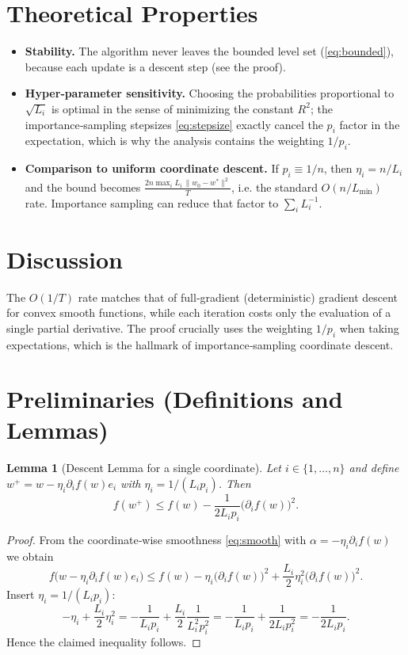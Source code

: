\documentclass{article}
\newtheorem{lemma}{Lemma}
\begin{document}
\section*{Theoretical Properties}
\begin{itemize}
\item \textbf{Stability.} The algorithm never leaves the bounded level set
(\ref{eq:bounded}), because each update is a descent step (see the proof).
\item \textbf{Hyper‑parameter sensitivity.}
Choosing the probabilities proportional to $\sqrt{L_i}$ is optimal in the
sense of minimizing the constant $R^2$; the importance‑sampling stepsizes
\eqref{eq:stepsize} exactly cancel the $p_i$ factor in the expectation, which
is why the analysis contains the weighting $1/p_i$.
\item \textbf{Comparison to uniform coordinate descent.}
If $p_i\equiv 1/n$, then $\eta_i=n/L_i$ and the bound becomes
$\frac{2n\max_i L_i\,\|w_0-w^*\|^2}{T}$, i.e. the standard $O(n/L_{\min})$ rate.
Importance sampling can reduce that factor to $\sum_i L_i^{-1}$.
\end{itemize}

\section*{Discussion}
The $O(1/T)$ rate matches that of full‑gradient (deterministic) gradient descent
for convex smooth functions, while each iteration costs only the evaluation of a
single partial derivative.  The proof crucially uses the weighting $1/p_i$
when taking expectations, which is the hallmark of importance‑sampling
coordinate descent.

\newpage
\section*{Preliminaries (Definitions and Lemmas)}
\begin{lemma}[Descent Lemma for a single coordinate]
\label{lem:descent}
Let $i\in\{1,\dots,n\}$ and define $w^{+}=w-\eta_i\partial_i f(w)e_i$ with
$\eta_i=1/(L_i p_i)$.  Then
\[
f(w^{+})\le f(w)-\frac{1}{2L_i p_i}\bigl(\partial_i f(w)\bigr)^{2}.
\]
\end{lemma}
\begin{proof}
From the coordinate‑wise smoothness \eqref{eq:smooth} with
$\alpha=-\eta_i\partial_i f(w)$ we obtain
\[
f\!\bigl(w-\eta_i\partial_i f(w)e_i\bigr)
\le f(w)-\eta_i\bigl(\partial_i f(w)\bigr)^2
+\frac{L_i}{2}\eta_i^{2}\bigl(\partial_i f(w)\bigr)^2 .
\]
Insert $\eta_i=1/(L_i p_i)$:
\[
-\eta_i+\frac{L_i}{2}\eta_i^{2}
=-\frac{1}{L_i p_i}+\frac{L_i}{2}\frac{1}{L_i^{2}p_i^{2}}
=-\frac{1}{L_i p_i}+\frac{1}{2L_i p_i^{2}}
=-\frac{1}{2L_i p_i}.
\]
Hence the claimed inequality follows. \hfill\qedsymbol
\end{proof}
\end{document}
